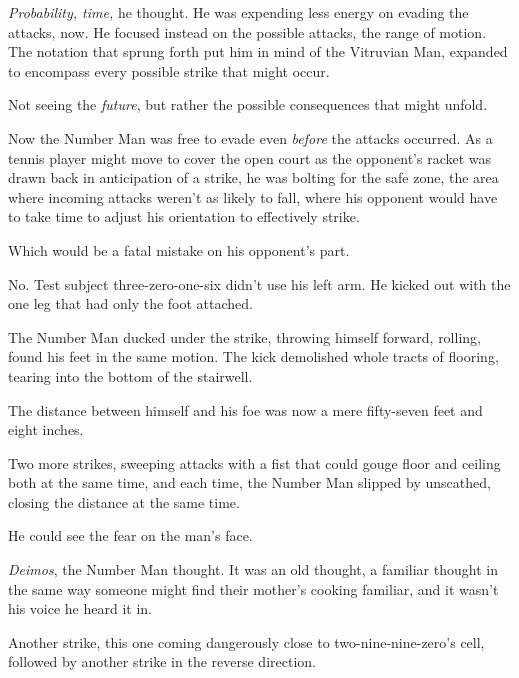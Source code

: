 \emph{Probability, time, }he thought.  He was expending less energy on evading the attacks, now.  He focused instead on the possible attacks, the range of motion.  The notation that sprung forth put him in mind of the Vitruvian Man, expanded to encompass every possible strike that might occur.



Not seeing the \emph{future}, but rather the possible consequences that might unfold.



Now the Number Man was free to evade even \emph{before} the attacks occurred.  As a tennis player might move to cover the open court as the opponent's racket was drawn back in anticipation of a strike, he was bolting for the safe zone, the area where incoming attacks weren't as likely to fall, where his opponent would have to take time to adjust his orientation to effectively strike.



Which would be a fatal mistake on his opponent's part.



No.  Test subject three-zero-one-six didn't use his left arm.  He kicked out with the one leg that had only the foot attached.



The Number Man ducked under the strike, throwing himself forward, rolling, found his feet in the same motion.  The kick demolished whole tracts of flooring, tearing into the bottom of the stairwell.



The distance between himself and his foe was now a mere fifty-seven feet and eight inches.



Two more strikes, sweeping attacks with a fist that could gouge floor and ceiling both at the same time, and each time, the Number Man slipped by unscathed, closing the distance at the same time.



He could see the fear on the man's face.



\emph{Deimos}, the Number Man thought.  It was an old thought, a familiar thought in the same way someone might find their mother's cooking familiar, and it wasn't his voice he heard it in.



Another strike, this one coming dangerously close to two-nine-nine-zero's cell, followed by another strike in the reverse direction.



